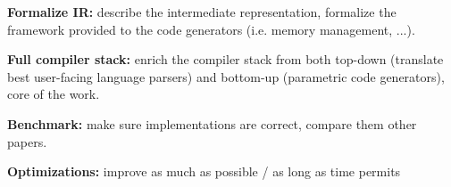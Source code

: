 \item \textbf{Formalize IR:} describe the intermediate representation, formalize the framework provided to the code generators (i.e. memory management, ...).
\item \textbf{Full compiler stack:} enrich the compiler stack from both top-down (translate best user-facing language parsers) and bottom-up (parametric code generators), core of the work.
\item \textbf{Benchmark:} make sure implementations are correct, compare them other papers.
\item \textbf{Optimizations:} improve as much as possible / as long as time permits
\ole






